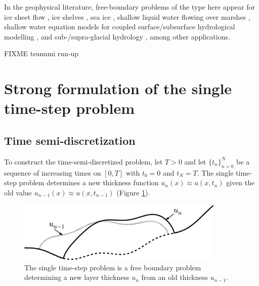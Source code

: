 \documentclass[final,leqno,onefignum,onetabnum]{siamltex1213bueler}
\begin{document}
In the geophysical literature, free-boundary problems of the type here appear for ice sheet flow \cite{Bueler2015,Bueleretal2005,CalvoDuranyVazquez2000,Calvoetal2002,EgholmNielsen2010,JouvetBueler2012}, ice shelves \cite{Albrechtetal2011}, sea ice \cite[and references therein]{LipscombHunke2004}, shallow liquid water flowing over marshes \cite{AlonsoSantillanaDawson2008}, shallow water equation models for coupled surface/subsurface hydrological modelling \cite{Maxwelletal2014}, and sub-/supra-glacial hydrology \cite{Aschwandenetal2012,BuelervanPelt2015,Schoofetal2012}, among other applications.

FIXME tsunumi run-up \cite{LeVequeetal2011}


\section{Strong formulation of the single time-step problem}  \label{sec:strongform}

\subsection{Time semi-discretization}  \label{subsec:strongsingle}  To construct the time-semi-discretized problem, let $T>0$ and let $\{t_n\}_{n=0}^N$ be a sequence of increasing times on $[0,T]$ with $t_0=0$ and $t_N=T$.  The single time-step problem determines a new thickness function $u_n(x) \approx u(x,t_n)$ given the old value $u_{n-1}(x) \approx u(x,t_{n-1})$ (Figure \ref{fig:timestepcartoon}).

\begin{figure}[ht]
\begin{center}
\includegraphics[width=3.9in,keepaspectratio=true]{time-step-cartoon}
\end{center}
\caption{The single time-step problem is a free boundary problem determining a new layer thickness $u_n$ from an old thickness $u_{n-1}$.}
\label{fig:timestepcartoon}
\end{figure}
\end{document}

